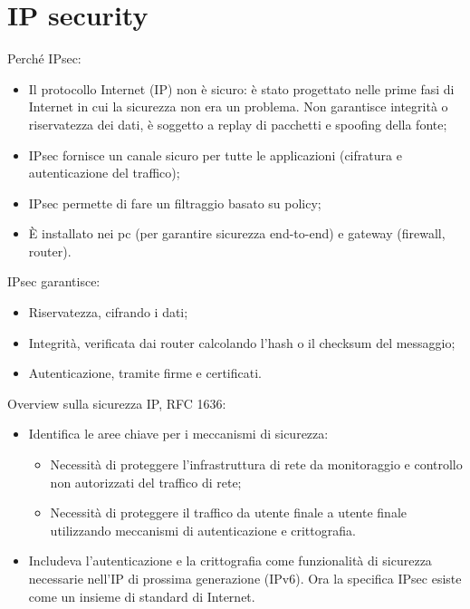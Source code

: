 \setchapterpreamble[u]{\margintoc}
\chapter{IP security}

Perché IPsec:
\begin{itemize}
    \item Il protocollo Internet (IP) non è sicuro:  è stato progettato nelle prime fasi di Internet in cui  la sicurezza non era un problema. Non garantisce integrità o riservatezza dei dati, è soggetto a replay di pacchetti e spoofing della fonte;
	\item IPsec fornisce un canale sicuro per tutte le applicazioni (cifratura e autenticazione del traffico);
	\item IPsec permette di fare un filtraggio basato su policy;
	\item È installato nei pc (per garantire sicurezza end-to-end) e gateway (firewall, router).
\end{itemize}

IPsec garantisce:
\begin{itemize}
    \item Riservatezza, cifrando i dati;
	\item Integrità, verificata dai router calcolando l'hash o il checksum del messaggio;
	\item Autenticazione, tramite firme e certificati.
\end{itemize}

Overview sulla sicurezza IP, RFC 1636:
\begin{itemize}
    \item Identifica le aree chiave per i meccanismi di sicurezza:
	\begin{itemize}
	    \item Necessità di proteggere l'infrastruttura di rete da monitoraggio e controllo non autorizzati del traffico di rete;
		\item Necessità di proteggere il traffico da utente finale a utente finale utilizzando meccanismi di autenticazione e crittografia.
	\end{itemize}
	\item Includeva l'autenticazione e la crittografia come funzionalità di sicurezza necessarie nell'IP di prossima generazione (IPv6). Ora la specifica IPsec esiste come un insieme di standard di Internet.
\end{itemize}

